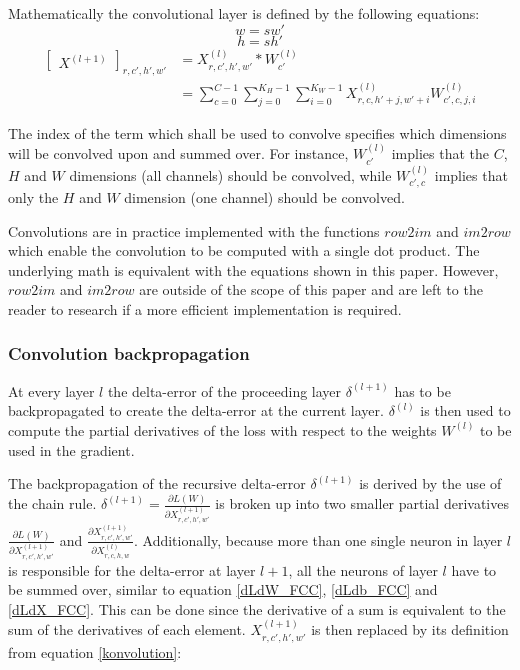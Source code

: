 \documentclass[a4paper,11pt,twoside]{article}
\newcommand*{\inpd}[2]{\ensuremath{\frac{\partial #1}{\partial #2}}}
\begin{document}
Mathematically the convolutional layer is defined by the following equations: \cite{cs231n} \cite{convmath}
\begin{equation}
w = sw'
\end{equation}
\begin{equation}
h = sh'
\end{equation}
\begin{equation}\label{konvolution}
\begin{split}
	\begin{bmatrix} X^{(l+1)} \end{bmatrix}_{r, c', h', w'}	
		& = X^{(l)}_{r, c', h', w'} *W^{(l)}_{c'} \\
		& = \sum^{C-1}_{c=0} \sum^{K_H-1}_{j=0} \sum^{K_W-1}_{i=0} X^{(l)}_{r, c, h'+j, w'+i}W^{(l)}_{c', c, j, i}
\end{split}
\end{equation}

The index of the term which shall be used to convolve specifies which dimensions will be convolved upon and summed over. For instance, $W^{(l)}_{c'}$ implies that the $C$, $H$ and $W$ dimensions (all channels) should be convolved, while $W^{(l)}_{c', c}$ implies that only the $H$ and $W$ dimension (one channel) should be convolved.

Convolutions are in practice implemented with the functions $row2im$ and $im2row$ which enable the convolution to be computed with a single dot product. The underlying math is equivalent with the equations shown in this paper. However, $row2im$ and $im2row$ are outside of the scope of this paper and are left to the reader to research if a more efficient implementation is required. \cite{cs231n} \cite{convmath} \cite{convarithmetic}

\subsubsection{Convolution backpropagation}
At every layer $l$ the delta-error of the proceeding layer $\delta^{(l+1)}$ has to be backpropagated to create the delta-error at the current layer. $\delta^{(l)}$ is then used to compute the partial derivatives of the loss with respect to the weights $W^{(l)}$ to be used in the gradient.

The backpropagation of the recursive delta-error $\delta^{(l+1)}$ is derived by the use of the chain rule. $\delta^{(l+1)} = \inpd{L(W)}{X^{(l+1)}_{r,c',h',w'}}$ is broken up into two smaller partial derivatives $\inpd{L(W)}{X^{(l+1)}_{r,c',h',w'}}$ and $\inpd{X^{(l+1)}_{r,c',h',w'}}{X^{(l)}_{r,c,h,w}}$. Additionally, because more than one single neuron in layer $l$ is responsible for the delta-error at layer $l+1$, all the neurons of layer $l$ have to be summed over, similar to equation \eqref{dLdW_FCC}, \eqref{dLdb_FCC} and \eqref{dLdX_FCC}. This can be done since the derivative of a sum is equivalent to the sum of the derivatives of each element. $X^{(l+1)}_{r,c',h',w'}$ is then replaced by its definition from equation \eqref{konvolution}: \cite{convmath} \cite{webconv1} \cite{webconv2} \cite{webconv3}
\end{document}
